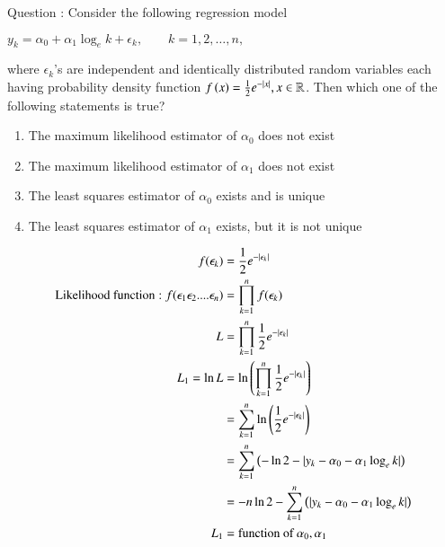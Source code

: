 \documentclass[journal,12pt,onecolumn]{IEEEtran}
\theoremstyle{remark}
\begin{document}
%
Question : Consider the following regression model
\begin{center}
	$y_{k} = \alpha_{0} + \alpha_{1} \log_{e}k + \epsilon_{k}, \qquad k = 1,2,…,n,$\\
\end{center}
where $\epsilon_{k}$'s are independent and identically distributed random variables each
having probability density function $ f\left(x\right) = \frac{1}{2} e^{-|x|}, x \in \mathbb{R}$. Then which one of
the following statements is true? 
\begin{enumerate}[label=(\Alph*)]
	\item The maximum likelihood estimator of $\alpha_{0}$ does not exist
	\item The maximum likelihood estimator of $\alpha_{1}$ does not exist
	\item The least squares estimator of $\alpha_{0}$ exists and is unique
	\item The least squares estimator of $\alpha_{1}$ exists, but it is not unique
\end{enumerate}
\solution
\begin{align}
	f(\epsilon_{k}) &= \frac{1}{2} e^{-|\epsilon_{k}|}\\
	\text{Likelihood function}: f(\epsilon_{1}\epsilon_{2}....\epsilon_{n}) &= \prod_{k = 1}^{n} f(\epsilon_{k})\\
	L     &= \prod_{k = 1}^{n}\frac{1}{2}e^{-|\epsilon_{k}|}\\
L_{1} = \ln L &= \ln\left(\prod_{k = 1}^{n}\frac{1}{2}e^{-|\epsilon_{k}|}\right)\\
	      &= \sum_{k = 1}^{n} \ln\left(\frac{1}{2}e^{-|\epsilon_{k}|}\right)\\
	      &= \sum_{k = 1}^{n} \left(-\ln 2 -|y_{k}-\alpha_{0}-\alpha_{1} \log_{e}k|\right)\\
	      &= -n\ln 2 -\sum_{k = 1}^{n} \left(|y_{k}-\alpha_{0}-\alpha_{1} \log_{e}k|\right)\\  
	L_{1} &= \text{function of }\alpha_{0}, \alpha_{1}
\end{align}
\end{document}
